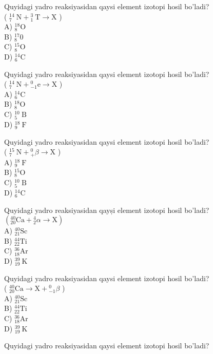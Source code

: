   \item Quyidagi yadro reaksiyasidan qaysi element izotopi hosil bo'ladi?\\
( ${ }_{7}^{14} \mathrm{~N}+{ }_{1}^{3} \mathrm{~T} \rightarrow \mathrm{X}$ )\\
A) ${ }_{8}^{18} \mathrm{O}$\\
B) ${ }_{8}^{17} 0$\\
C) ${ }_{8}^{15} \mathrm{O}$\\
D) ${ }_{6}^{14} \mathrm{C}$
  \item Quyidagi yadro reaksiyasidan qaysi element izotopi hosil bo'ladi?\\
( ${ }_{7}^{14} \mathrm{~N}+{ }_{-1}^{0} \mathrm{e} \rightarrow \mathrm{X}$ )\\
A) ${ }_{6}^{14} \mathrm{C}$\\
B) ${ }_{8}^{18} \mathrm{O}$\\
C) ${ }_{5}^{10} \mathrm{~B}$\\
D) ${ }_{9}^{18} \mathrm{~F}$
  \item Quyidagi yadro reaksiyasidan qaysi element izotopi hosil bo'ladi?\\
( ${ }_{7}^{15} \mathrm{~N}+{ }_{+}^{0} \beta \rightarrow \mathrm{X}$ )\\
A) ${ }_{9}^{18} \mathrm{~F}$\\
B) ${ }_{8}^{15} \mathrm{O}$\\
C) ${ }_{5}^{10} \mathrm{~B}$\\
D) ${ }_{6}^{14} \mathrm{C}$
  \item Quyidagi yadro reaksiyasidan qayși element izotopi hosil bo'ladi?\\
$\left({ }_{20}^{40} \mathrm{Ca}+{ }_{2}^{4} \alpha \rightarrow \mathrm{X}\right)$\\
A) ${ }_{21}^{40} \mathrm{Sc}$\\
B) ${ }_{22}^{44} \mathrm{Ti}$\\
C) ${ }_{18}^{36} \mathrm{Ar}$\\
D) ${ }_{19}^{39} \mathrm{~K}$
  \item Quyidagi yadro reaksiyasidan qaysi element izotopi hosil bo'ladi?\\
( ${ }_{20}^{40} \mathrm{Ca} \rightarrow \mathrm{X}+{ }_{-1}^{0} \beta$ )\\
A) ${ }_{21}^{40} \mathrm{Sc}$\\
B) ${ }_{22}^{44} \mathrm{Ti}$\\
C) ${ }_{18}^{36} \mathrm{Ar}$\\
D) ${ }_{19}^{39} \mathrm{~K}$
  \item Quyidagi yadro reaksiyasidan qaysi element izotopi hosil bo'ladi?\\
